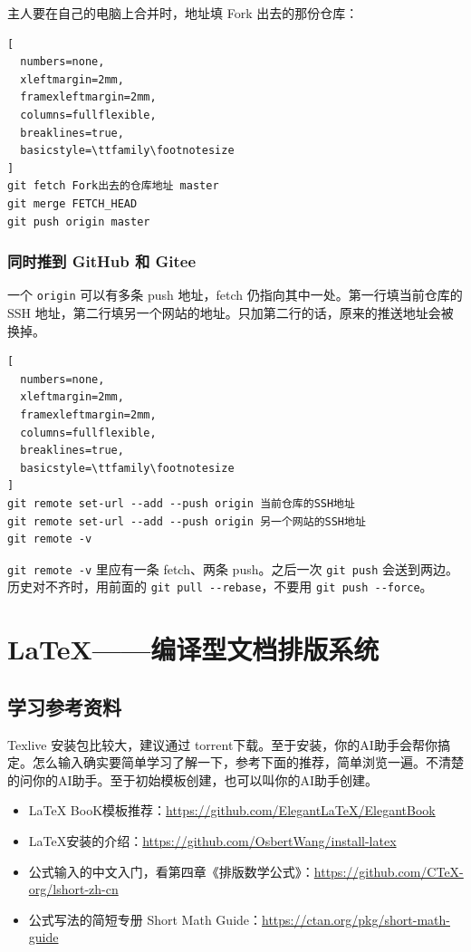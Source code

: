 主人要在自己的电脑上合并时，地址填 Fork 出去的那份仓库：
\begin{lstlisting}[
  numbers=none,
  xleftmargin=2mm,
  framexleftmargin=2mm,
  columns=fullflexible,
  breaklines=true,
  basicstyle=\ttfamily\footnotesize
]
git fetch Fork出去的仓库地址 master
git merge FETCH_HEAD
git push origin master
\end{lstlisting}

\subsection{同时推到 GitHub 和 Gitee}
一个 \verb|origin| 可以有多条 push 地址，fetch 仍指向其中一处。第一行填当前仓库的 SSH 地址，第二行填另一个网站的地址。只加第二行的话，原来的推送地址会被换掉。

\begin{lstlisting}[
  numbers=none,
  xleftmargin=2mm,
  framexleftmargin=2mm,
  columns=fullflexible,
  breaklines=true,
  basicstyle=\ttfamily\footnotesize
]
git remote set-url --add --push origin 当前仓库的SSH地址
git remote set-url --add --push origin 另一个网站的SSH地址
git remote -v
\end{lstlisting}
\verb|git remote -v| 里应有一条 fetch、两条 push。之后一次 \verb|git push| 会送到两边。历史对不齐时，用前面的 \verb|git pull --rebase|，不要用 \verb|git push --force|。

\chapter{\LaTeX{}——编译型文档排版系统}
\section{学习参考资料}
\begin{xiaonao}[怎么安装、学习？]
Texlive 安装包比较大，建议通过 torrent下载。至于安装，你的AI助手会帮你搞定。怎么输入确实要简单学习了解一下，参考下面的推荐，简单浏览一遍。不清楚的问你的AI助手。至于初始模板创建，也可以叫你的AI助手创建。
\end{xiaonao}


\begin{itemize}
\item \LaTeX{} BooK模板推荐：\url{https://github.com/ElegantLaTeX/ElegantBook}
\item \LaTeX{}安装的介绍：\url{https://github.com/OsbertWang/install-latex}
\item 公式输入的中文入门，看第四章《排版数学公式》：\url{https://github.com/CTeX-org/lshort-zh-cn}
\item 公式写法的简短专册 Short Math Guide：\url{https://ctan.org/pkg/short-math-guide}
\end{itemize}

